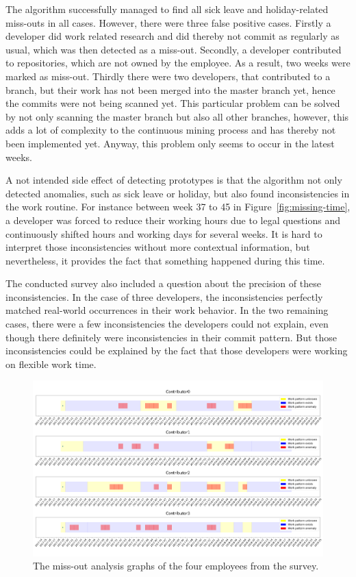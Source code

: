 The algorithm successfully managed to find all sick leave and holiday-related miss-outs in all cases.
However, there were three false positive cases.
Firstly a developer did work related research and did thereby not commit as regularly as usual, which was then detected as a miss-out.
Secondly, a developer contributed to repositories, which are not owned by the employee.
As a result, two weeks were marked as miss-out.
Thirdly there were two developers, that contributed to a branch, but their work has not been merged into the master branch yet, hence the commits were not being scanned yet.
This particular problem can be solved by not only scanning the master branch but also all other branches, however, this adds a lot of complexity to the continuous mining process and has thereby not been implemented yet.
Anyway, this problem only seems to occur in the latest weeks.

A not intended side effect of detecting prototypes is that the algorithm not only detected anomalies, such as sick leave or holiday, but also found inconsistencies in the work routine.
For instance between week 37 to 45 in Figure~\ref{fig:missing-time}, a developer was forced to reduce their working hours due to legal questions and continuously shifted hours and working days for several weeks.
It is hard to interpret those inconsistencies without more contextual information, but nevertheless, it provides the fact that something happened during this time.

The conducted survey also included a question about the precision of these inconsistencies.
In the case of three developers, the inconsistencies perfectly matched real-world occurrences in their work behavior.
In the two remaining cases, there were a few inconsistencies the developers could not explain, even though there definitely were inconsistencies in their commit pattern.
But those inconsistencies could be explained by the fact that those developers were working on flexible work time.

\begin{figure}[h]
    \includegraphics[scale=0.19]{./graphs/analysis/work-time-analysis-comparison}
    \centering
    \caption{The miss-out analysis graphs of the four employees from the survey.}\label{fig:miss-out-comparison}
\end{figure}

